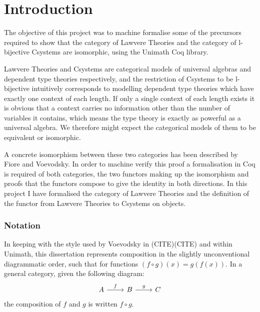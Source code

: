 \chapter{Introduction}
The objective of this project was to machine formalise some of the precursors
required to show that the category of Lawvere Theories and the category of
l-bijective Csystems are isomorphic, using the Unimath Coq library. 

Lawvere Theories and Csystems are categorical models of
universal algebras and dependent type theories respectively, and the restriction
of Csystems to be l-bijective intuitively corresponds to modelling dependent
type theories which have exactly one context of each length. If only a single
context of each length exists it is obvious that a context carries no
information other than the number of variables it contains, which means the type
theory is exactly as powerful as a universal algebra. We therefore might expect
the categorical models of them to be equivalent or isomorphic.

A concrete isomorphism between these two categories has been described by Fiore
and Voevodsky. In order to machine verify this proof a formalisation in Coq is
required of both categories, the two functors making up the isomorphism and
proofs that the functors compose to give the identity in both directions. In
this project I have formalised the category of Lawvere Theories and the
definition of the functor from Lawvere Theories to Csystems on objects.

\subsection*{Notation}
In keeping with the style used by Voevodsky in (CITE)(CITE) and within Unimath,
this dissertation represents composition in the slightly unconventional
diagrammatic order, such that for functions $(f\circ g)(x) = g(f(x))$. In a
general category, given the following diagram:
\[
\begin{tikzcd}
    A\ar[r,"f"]&B\ar[r,"g"]&C
\end{tikzcd}
\]
the composition of $f$ and $g$ is written $f\circ g$.